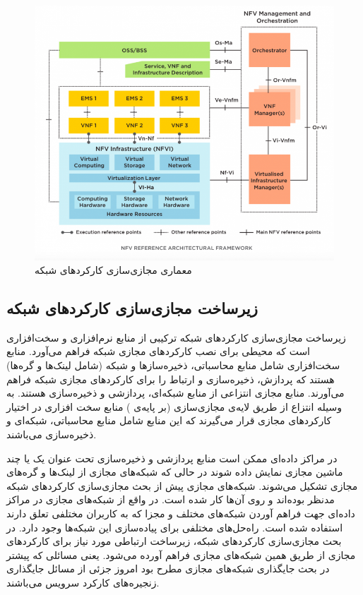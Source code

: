 \begin{figure}[!h]
\center\includegraphics[scale=.5]{images/nfv-arch}
\caption{معماری مجازی‌سازی کارکردهای شبکه
}\label{fig.1}
\end{figure}

\subsection{زیرساخت مجازی‌سازی کارکردهای شبکه}
زیرساخت مجازی‌سازی کارکردهای شبکه ترکیبی از منابع نرم‌افزاری و سخت‌افزاری است
که محیطی برای نصب
کارکردهای مجازی شبکه فراهم می‌آورد.
منابع سخت‌افزاری شامل منابع محاسباتی،
ذخیره‌سازها و شبکه
(شامل لینک‌ها و گره‌ها)
هستند
که پردازش، ذخیره‌سازی و ارتباط را
برای کارکردهای مجازی شبکه فراهم می‌آورند.
منابع مجازی انتزاعی از منابع شبکه‌ای، پردازشی و ذخیر‌ه‌سازی هستند.
به وسیله انتزاع از طریق لایه‌ی مجازی‌سازی (بر پایه‌ی )
منابع سخت افزاری در اختیار کارکردهای مجازی
قرار می‌گیرند که این منابع شامل منابع محاسباتی، شبکه‌ای و ذخیره‌سازی می‌باشند.

در مراکز داده‌ای ممکن است منابع پردازشی و ذخیره‌سازی تحت عنوان یک یا چند
ماشین مجازی نمایش داده شوند در حالی که شبکه‌های مجازی از لینک‌ها و گره‌های مجازی تشکیل می‌شوند.
شبکه‌های مجازی پیش از بحث مجازی‌سازی کارکردهای شبکه مدنظر بوده‌اند و روی آن‌ها کار شده است.
در واقع از شبکه‌های مجازی در مراکز داده‌ای جهت فراهم آوردن شبکه‌های مختلف و مجزا که به کاربران مختلفی تعلق دارند
استفاده شده است. راه‌حل‌های مختلفی برای پیاده‌سازی این شبکه‌ها وجود دارد. در بحث مجازی‌سازی کارکردهای شبکه‌، زیرساخت ارتباطی
مورد نیاز 
برای کارکردهای مجازی از طریق همین شبکه‌های مجازی فراهم آورده می‌شود.
یعنی مسائلی که پیشتر در بحث جایگذاری شبکه‌های مجازی مطرح بود
امروز جزئی از مسائل جایگذاری زنجیره‌های کارکرد سرویس می‌باشند.

